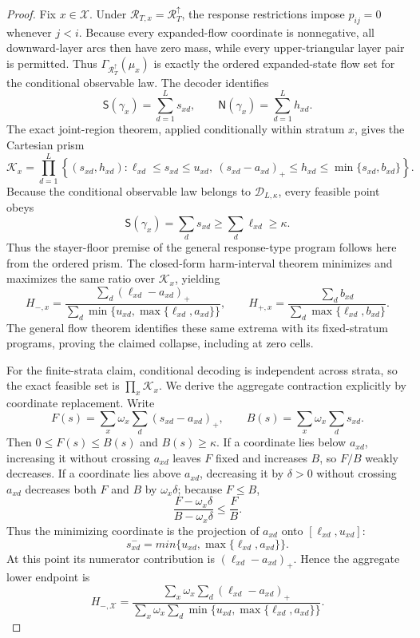 \documentclass{article}
\begin{document}
\begin{proof}
Fix \(x\in\mathcal X\).  Under \(\mathcal R_{T,x}=\mathcal R_T^{\uparrow}\), the response restrictions impose \(p_{ij}=0\) whenever \(j<i\).  Because every expanded-flow coordinate is nonnegative, all downward-layer arcs then have zero mass, while every upper-triangular layer pair is permitted.  Thus \(\Gamma_{\mathcal R_T^{\uparrow}}(\mu_x)\) is exactly the ordered expanded-state flow set for the conditional observable law.  The decoder identifies
\[
 \mathsf S(\gamma_x)=\sum_{d=1}^{L}s_{xd},
 \qquad
 \mathsf N(\gamma_x)=\sum_{d=1}^{L}h_{xd}.
\]
The exact joint-region theorem, applied conditionally within stratum \(x\), gives the Cartesian prism
\[
 \mathcal K_x=
 \prod_{d=1}^{L}
 \left\{(s_{xd},h_{xd}):
 \ell_{xd}\le s_{xd}\le u_{xd},\ 
 (s_{xd}-a_{xd})_+\le h_{xd}
 \le\min\{s_{xd},b_{xd}\}\right\}.
\]
Because the conditional observable law belongs to \(\mathcal D_{L,\kappa}\), every feasible point obeys
\[
 \mathsf S(\gamma_x)=\sum_ds_{xd}
 \ge\sum_d\ell_{xd}\ge\kappa.
\]
Thus the stayer-floor premise of the general response-type program follows here from the ordered prism.  The closed-form harm-interval theorem minimizes and maximizes the same ratio over \(\mathcal K_x\), yielding
\[
 H_{-,x}=
 \frac{\sum_d(\ell_{xd}-a_{xd})_+}
 {\sum_d\min\{u_{xd},\max\{\ell_{xd},a_{xd}\}\}},
 \qquad
 H_{+,x}=
 \frac{\sum_db_{xd}}
 {\sum_d\max\{\ell_{xd},b_{xd}\}}.
\]
The general flow theorem identifies these same extrema with its fixed-stratum programs, proving the claimed collapse, including at zero cells.

For the finite-strata claim, conditional decoding is independent across strata, so the exact feasible set is \(\prod_x\mathcal K_x\).  We derive the aggregate contraction explicitly by coordinate replacement.  Write
\[
 F(s)=\sum_x\omega_x\sum_d(s_{xd}-a_{xd})_+,
 \qquad
 B(s)=\sum_x\omega_x\sum_ds_{xd}.
\]
Then \(0\le F(s)\le B(s)\) and \(B(s)\ge\kappa\).  If a coordinate lies below \(a_{xd}\), increasing it without crossing \(a_{xd}\) leaves \(F\) fixed and increases \(B\), so \(F/B\) weakly decreases.  If a coordinate lies above \(a_{xd}\), decreasing it by \(\delta>0\) without crossing \(a_{xd}\) decreases both \(F\) and \(B\) by \(\omega_x\delta\); because \(F\le B\),
\[
 \frac{F-\omega_x\delta}{B-\omega_x\delta}
 \le\frac FB.
\]
Thus the minimizing coordinate is the projection of \(a_{xd}\) onto \([\ell_{xd},u_{xd}]\):
\[
 s_{xd}^-=min\{u_{xd},\max\{\ell_{xd},a_{xd}\}\}.
\]
At this point its numerator contribution is \((\ell_{xd}-a_{xd})_+\).  Hence the aggregate lower endpoint is
\[
 H_{-,\mathcal X}=
 \frac{\sum_x\omega_x\sum_d(\ell_{xd}-a_{xd})_+}
 {\sum_x\omega_x\sum_d
 \min\{u_{xd},\max\{\ell_{xd},a_{xd}\}\}}.
\]


\end{proof}
\end{document}

